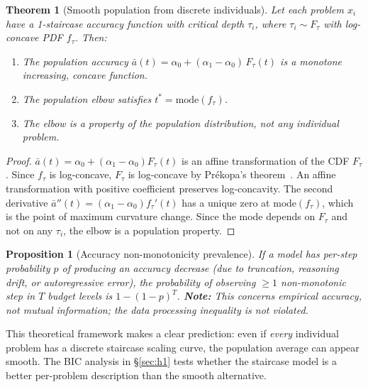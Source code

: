 \documentclass{article}
\newtheorem{theorem}{Theorem}
\newtheorem{proposition}{Proposition}
\begin{document}
\begin{theorem}[Smooth population from discrete individuals]
\label{thm:population}
Let each problem $x_i$ have a 1-staircase accuracy function with critical depth $\tau_i$, where $\tau_i \sim F_\tau$ with log-concave PDF $f_\tau$.  Then:
\begin{enumerate}[itemsep=1pt]
    \item The population accuracy $\bar{a}(t) = \alpha_0 + (\alpha_1 - \alpha_0)\, F_\tau(t)$ is a monotone increasing, concave function.
    \item The population elbow satisfies $t^* = \mathrm{mode}(f_\tau)$.
    \item The elbow is a property of the \emph{population distribution}, not any individual problem.
\end{enumerate}
\end{theorem}

\begin{proof}
$\bar{a}(t) = \alpha_0 + (\alpha_1 - \alpha_0) F_\tau(t)$ is an affine transformation of the CDF $F_\tau$.  Since $f_\tau$ is log-concave, $F_\tau$ is log-concave by Pr\'{e}kopa's theorem~\citep{prekopa1973logconcave}.  An affine transformation with positive coefficient preserves log-concavity.  The second derivative $\bar{a}''(t) = (\alpha_1 - \alpha_0) f_\tau'(t)$ has a unique zero at $\mathrm{mode}(f_\tau)$, which is the point of maximum curvature change.  Since the mode depends on $F_\tau$ and not on any $\tau_i$, the elbow is a population property.
\end{proof}

\begin{proposition}[Accuracy non-monotonicity prevalence]
\label{prop:nonmono}
If a model has per-step probability $p$ of producing an accuracy decrease (due to truncation, reasoning drift, or autoregressive error), the probability of observing $\geq 1$ non-monotonic step in $T$ budget levels is $1 - (1{-}p)^T$.  \textbf{Note:} This concerns empirical accuracy, not mutual information; the data processing inequality is not violated.
\end{proposition}

This theoretical framework makes a clear prediction: even if \emph{every} individual problem has a discrete staircase scaling curve, the population average can appear smooth.  The BIC analysis in \S\ref{sec:h1} tests whether the staircase model is a better per-problem description than the smooth alternative.

\end{document}
